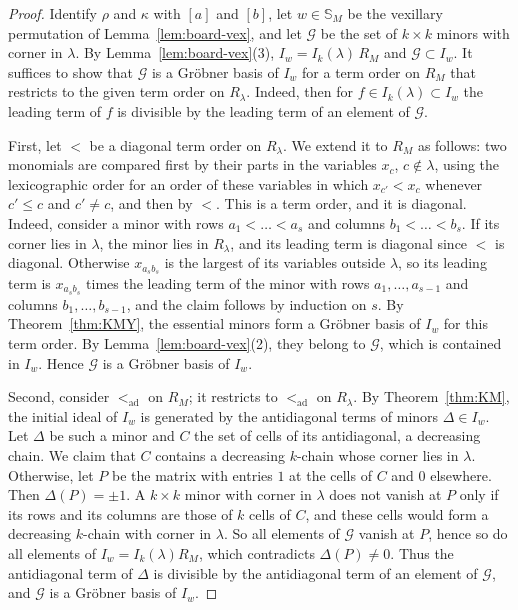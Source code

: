 \documentclass[11pt]{amsart}
\theoremstyle{definition}
\theoremstyle{remark}
\newcommand{\bS}{\mathbb{S}}
\newcommand{\ad}{\mathrm{ad}}
\begin{document}
\begin{proof}
Identify $\rho$ and $\kappa$ with $[a]$ and $[b]$, let $w\in\bS_M$ be the vexillary permutation of Lemma~\ref{lem:board-vex}, and let $\mathcal G$ be the set of $k\times k$ minors with corner in $\lambda$. By Lemma~\ref{lem:board-vex}(3), $I_w=I_k(\lambda)\,R_M$ and $\mathcal G\subset I_w$. It suffices to show that $\mathcal G$ is a Gr\"obner basis of $I_w$ for a term order on $R_M$ that restricts to the given term order on $R_\lambda$. Indeed, then for $f\in I_k(\lambda)\subset I_w$ the leading term of $f$ is divisible by the leading term of an element of $\mathcal G$.

First, let $<$ be a diagonal term order on $R_\lambda$. We extend it to $R_M$ as follows: two monomials are compared first by their parts in the variables $x_c$, $c\notin\lambda$, using the lexicographic order for an order of these variables in which $x_{c'}<x_c$ whenever $c'\le c$ and $c'\ne c$, and then by $<$. This is a term order, and it is diagonal. Indeed, consider a minor with rows $a_1<\dots<a_s$ and columns $b_1<\dots<b_s$. If its corner lies in $\lambda$, the minor lies in $R_\lambda$, and its leading term is diagonal since $<$ is diagonal. Otherwise $x_{a_sb_s}$ is the largest of its variables outside $\lambda$, so its leading term is $x_{a_sb_s}$ times the leading term of the minor with rows $a_1,\dots,a_{s-1}$ and columns $b_1,\dots,b_{s-1}$, and the claim follows by induction on $s$. By Theorem~\ref{thm:KMY}, the essential minors form a Gr\"obner basis of $I_w$ for this term order. By Lemma~\ref{lem:board-vex}(2), they belong to $\mathcal G$, which is contained in $I_w$. Hence $\mathcal G$ is a Gr\"obner basis of $I_w$.

Second, consider $<_\ad$ on $R_M$; it restricts to $<_\ad$ on $R_\lambda$. By Theorem~\ref{thm:KM}, the initial ideal of $I_w$ is generated by the antidiagonal terms of minors $\Delta\in I_w$. Let $\Delta$ be such a minor and $C$ the set of cells of its antidiagonal, a decreasing chain. We claim that $C$ contains a decreasing $k$-chain whose corner lies in $\lambda$. Otherwise, let $P$ be the matrix with entries $1$ at the cells of $C$ and $0$ elsewhere. Then $\Delta(P)=\pm1$. A $k\times k$ minor with corner in $\lambda$ does not vanish at $P$ only if its rows and its columns are those of $k$ cells of $C$, and these cells would form a decreasing $k$-chain with corner in $\lambda$. So all elements of $\mathcal G$ vanish at $P$, hence so do all elements of $I_w=I_k(\lambda)R_M$, which contradicts $\Delta(P)\ne0$. Thus the antidiagonal term of $\Delta$ is divisible by the antidiagonal term of an element of $\mathcal G$, and $\mathcal G$ is a Gr\"obner basis of $I_w$.


\end{proof}
\end{document}

